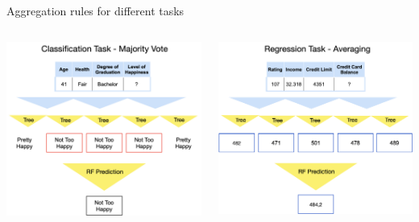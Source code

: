 \documentclass[11pt,compress,t,notes=noshow, xcolor=table]{beamer}
\begin{document}
\begin{vbframe}{Aggregation rules for different tasks}
\begin{columns}  
\begin{column}{0.5\textwidth} 
\begin{center}
 \includegraphics[width = 1\textwidth]{slides/forests/figure_man/nutshell-randomforest-aggregation-classif.png}
 \end{center}
\end{column}
\begin{column}{0.5\textwidth} 
\begin{center}
  \includegraphics[width = 1\textwidth]{slides/forests/figure_man/nutshell-randomforest-aggregation-regression.png}
\end{center}
\end{column}
\end{columns}




\end{vbframe}
\end{document}
